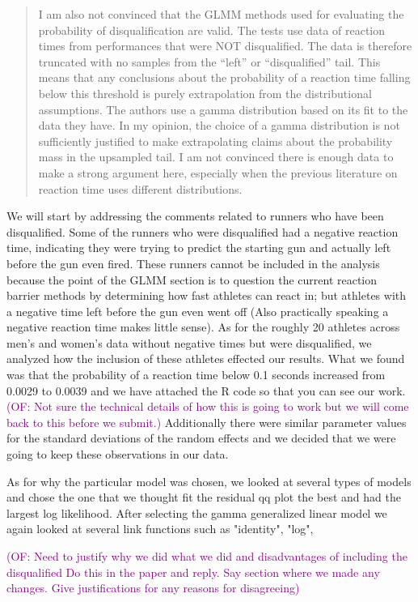 \documentclass[12pt]{article}
\newcommand{\of}[1]{\textcolor{purple}{(OF: #1)}}
\newenvironment{comment}%
{\begin{quotation}\noindent\small\it\color{darkblue}\ignorespaces%
}{\end{quotation}}
\begin{document}
\begin{comment}
I am also not convinced that the GLMM methods used for evaluating the
probability of disqualification are valid. The tests use data of reaction times
from performances that were NOT disqualified.  The data is therefore truncated
with no samples from the “left” or “disqualified” tail. This means that any
conclusions about the probability of a reaction time falling below this
threshold is purely extrapolation from the distributional assumptions. The
authors use a gamma distribution based on its fit to the data they have. In my
opinion, the choice of a gamma distribution is not sufficiently justified to
make extrapolating claims about the probability mass in the upsampled tail. I am
not convinced there is enough data to make a strong argument here, especially
when the previous literature on reaction time uses different distributions.
\end{comment}
We will start by addressing the comments related to runners who have been
disqualified.  Some of the runners who were disqualified had a negative reaction
time, indicating they were trying to predict the starting gun and actually left
before the gun even fired.  These runners cannot be included in the analysis
because the point of the GLMM section is to question the current reaction barrier
methods by determining how fast athletes can react in; but athletes with a
negative time left before the gun even went off (Also practically speaking
a negative reaction time makes little sense).  As for the roughly 20 athletes
across men's and women's data without negative times but were disqualified, we
analyzed how the inclusion of these athletes effected our results.  What we found
was that the probability of a reaction time below 0.1 seconds increased from
0.0029 to 0.0039 and we have attached the R code so that you can see our work.
\of{Not sure the technical details of how this is going to work but we will come
back to this before we submit.} Additionally there were similar parameter values
for the standard deviations of the random effects and we decided that we were
going to keep these observations in our data.

As for why the particular model was
chosen, we looked at several types of models and chose the one that we thought
fit the residual qq plot the best and had the largest log likelihood. After
selecting the gamma generalized linear model we again looked at several link
functions such as "identity", "log",

\of{Need to justify why we did what we did and disadvantages of including the
disqualified
Do this in the paper and reply. Say section where we made any changes. Give
justifications for any reasons for disagreeing}
\end{document}
